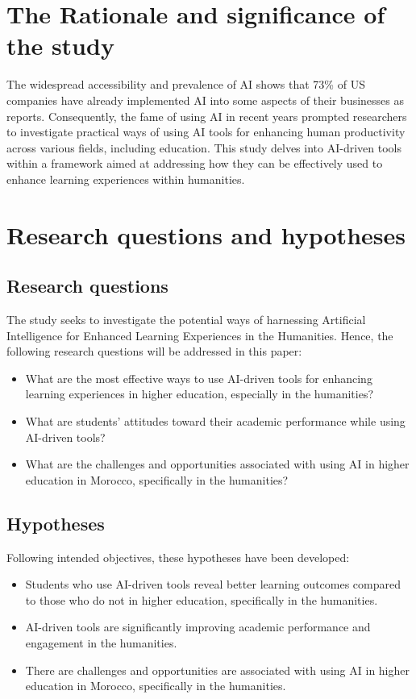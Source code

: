 \section{The Rationale and significance of the study}\label{sec:the-rationale-and-significance-of-the-study}
\justifying
The widespread accessibility and prevalence of AI shows that 73\% of US companies have already
implemented AI into some aspects of their businesses as \citep{pricewaterhousecoopers} reports.
Consequently, the fame of using AI in recent years prompted researchers to investigate practical
ways of using AI tools for enhancing human productivity across various fields,
including education.
This study delves into AI-driven tools within a framework aimed at addressing
how they can be effectively used to enhance learning experiences within humanities.

\section{Research questions and hypotheses}\label{sec:research-questions-and-hypotheses}
\subsection{Research questions}\label{subsec:research-questions}
\justifying
The study seeks to investigate the potential ways
of harnessing Artificial Intelligence for
Enhanced Learning Experiences in the Humanities.
Hence,
the following research questions will be addressed in this paper:
\begin{itemize}
	\item What are the most effective ways to use AI-driven
	      tools for enhancing learning experiences in higher education,
	      especially in the humanities?
	\item What are students’ attitudes toward their academic performance
	      while using AI-driven tools?
	\item What are the challenges and opportunities associated
	      with using AI in higher education in Morocco,
	      specifically in the humanities?
\end{itemize}
\subsection{Hypotheses}\label{subsec:hypotheses}
\justifying
\noindent
Following intended objectives, these hypotheses have been developed:
\begin{itemize}
	\item Students who use AI-driven tools reveal better learning outcomes
	      compared to those who do not in higher education, specifically in the humanities.
	\item AI-driven tools are significantly improving academic
	      performance and engagement in the humanities.
	\item There are challenges and opportunities are associated with using AI in higher
	      education in Morocco, specifically in the humanities.
\end{itemize}

